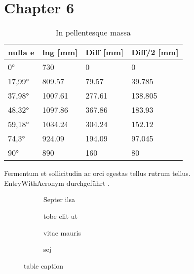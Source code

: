 \documentclass[../main.tex]{subfiles}
\begin{document}
\section{Chapter 6}
\lipsum[5]

\begin{table}[H]
	\centering
	\begin{tabular}{llll}
		\toprule
		\textbf{nulla e} & \textbf{lng [mm]} & \textbf{Diff [mm]} & \textbf{Diff/2 [mm]} \\
		\midrule\morecmidrules\midrule
		\ang{0}          & 730               & 0                  & 0                    \\
		\midrule
		\ang{17,99}      & \num{809,57}      & \num{79,57}        & \num{39,785}         \\
		\ang{37,98}      & \num{1007,61}     & \num{277,61}       & \num{138,805}        \\
		\ang{48,32}      & \num{1097,86}     & \num{367,86}       & \num{183,93}         \\
		\ang{59,18}      & \num{1034,24}     & \num{304,24}       & \num{152,12}         \\
		\ang{74,3}       & \num{924,09}      & \num{194,09}       & \num{97,045}         \\
		\ang{90}         & \num{890}         & \num{160}          & \num{80}             \\
		\bottomrule
	\end{tabular}
	\caption{In pellentesque massa}
	\label{tab:tablelabeldqwfinweopv}
\end{table}

\pagebreak

Fermentum et sollicitudin ac orci  egestas tellus  rutrum tellus. \gls{EntryWithAcronym} durchgeführt .
\begin{figure}[H]
	\centering

	\begin{subfigure}[c]{0.49\linewidth}
		\caption{Septer ilsa}
		\label{fig:subfigureexample1}
	\end{subfigure}\hfill
	\begin{subfigure}[c]{0.49\linewidth}
		\caption{tobe elit ut}
		\label{fig:subfigureexample2}
	\end{subfigure}\par\medskip
	\begin{subfigure}[c]{0.49\linewidth}
		\caption{vitae mauris}
		\label{fig:subfigureexample3}
	\end{subfigure}\hfill
	\begin{subfigure}[c]{0.49\linewidth}
		\caption{sej}
		\label{fig:subfigureexample4}
	\end{subfigure}

	\caption{table caption}
	\label{fig:subfigureexample}
\end{figure}

\end{document}
